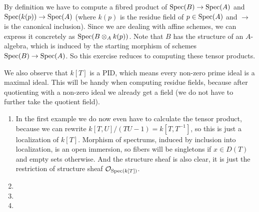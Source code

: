 \begin{exercise}{3}
    By definition we have to compute a fibred product of $\operatorname{Spec}(B) \to \operatorname{Spec}(A)$
    and $\operatorname{Spec}(k(p)) \to \operatorname{Spec}(A)$ (where $k(p)$ is the residue field of $p \in
    \operatorname{Spec}(A)$ and $\to$ is the canonical inclusion). Since we are dealing with
    affine schemes, we can express it concretely as $\operatorname{Spec}(B \otimes_A k(p))$.
    Note that $B$ has the structure of an $A$-algebra, which is induced
    by the starting morphism of schemes $\operatorname{Spec}(B) \rightarrow \operatorname{Spec}(A)$.
    So this exercise reduces to computing these tensor products.
    
    We also observe that $k[T]$ is a PID, which means every non-zero prime ideal
    is a maximal ideal. This will be handy when computing residue fields,
    because after quotienting with a non-zero ideal we already get a field (we do
    not have to further take the quotient field).

    \begin{enumerate}
        \item{In the first example we do now even have to calculate the tensor
            product, because we can rewrite $k[T, U]/(TU - 1) = k[T, T^{-1}]$,
            so this is just a localization of $k[T]$. Morphism of spectrums,
            induced by inclusion into localization, is an open immersion, so
            fibers will be singletons if $x \in D(T)$ and empty sets otherwise.
            And the structure sheaf is also clear, it is just the restriction of
            structure sheaf $\mathcal{O}_{\operatorname{Spec}(k[T])}$.}
        \item{}
        \item{}
        \item{}
    \end{enumerate}
\end{exercise}

